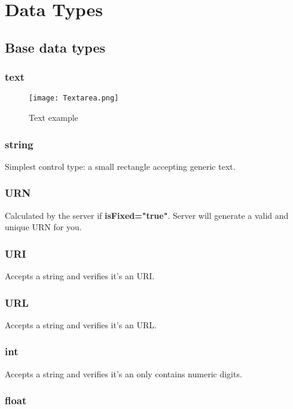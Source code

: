 \section{Data Types} 
\label{datatypes}

\subsection{Base data types}
\label{base-types}

\subsubsection{text}
\label{text}

\begin{figure}[h]
	\caption{Text example}
	\texttt{[image: Textarea.png]}
	\centering
\end{figure}

\subsubsection{string}
\label{string}

Simplest control type: a small rectangle accepting generic text.

\subsubsection{URN}
\label{URN}

Calculated by the server if \textbf{isFixed="true"}.
Server will generate a valid and unique URN for you.

\subsubsection{URI}
\label{URI}

Accepts a string and verifies it's an URI.

\subsubsection{URL}
\label{URL}
Accepts a string and verifies it's an URL.

\subsubsection{int}
\label{int}
Accepts a string and verifies it's an only contains numeric digits.

\subsubsection{float}
\label{real}

